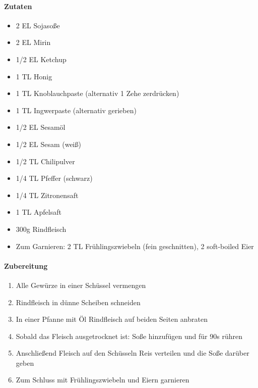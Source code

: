 \clearpage
{}

\paragraph{Zutaten}
\begin{itemize}[noitemsep]
	\item 2 EL Sojasoße
	\item 2 EL Mirin
	\item 1/2 EL Ketchup
	\item 1 TL Honig
	\item 1 TL Knoblauchpaste (alternativ 1 Zehe zerdrücken)
	\item 1 TL Ingwerpaste (alternativ gerieben)
	\item 1/2 EL Sesamöl
	\item 1/2 EL Sesam (weiß)
	\item 1/2 TL Chilipulver
	\item 1/4 TL Pfeffer (schwarz)
	\item 1/4 TL Zitronensaft
	\item 1 TL Apfelsaft
	\vspace{0.5cm}
	\item 300g Rindfleisch
	\item Zum Garnieren: 2 TL Frühlingszwiebeln (fein geschnitten), 2 soft-boiled Eier
\end{itemize}

\paragraph{Zubereitung}
\begin{enumerate}[noitemsep]
	\item Alle Gewürze in einer Schüssel vermengen
	\item Rindfleisch in dünne Scheiben schneiden
	\item In einer Pfanne mit Öl Rindfleisch auf beiden Seiten anbraten
	\item Sobald das Fleisch ausgetrocknet ist: Soße hinzufügen und für 90s rühren
	\item Anschließend Fleisch auf den Schüsseln Reis verteilen und die Soße darüber geben
	\item Zum Schluss mit Frühlingszwiebeln und Eiern garnieren
\end{enumerate}
